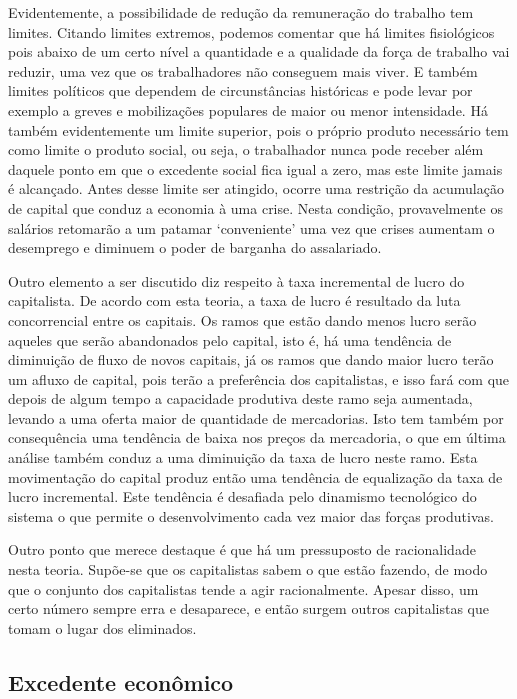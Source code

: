 Evidentemente, a possibilidade de redução da remuneração do trabalho tem limites. Citando limites extremos, podemos comentar que há limites fisiológicos pois abaixo de um certo nível a quantidade e a qualidade da força de trabalho vai reduzir, uma vez que os trabalhadores não conseguem mais viver. E também limites políticos  que dependem de circunstâncias históricas e pode levar por exemplo a greves e mobilizações populares de maior ou menor intensidade. Há também evidentemente um limite superior, pois o próprio produto necessário tem como limite o produto social, ou seja, o trabalhador nunca pode receber além daquele ponto em que o excedente social fica igual a zero, mas este limite jamais é alcançado. Antes desse limite ser atingido, ocorre uma restrição da acumulação de capital que conduz a economia à uma crise. Nesta condição, provavelmente os salários retomarão a um patamar `conveniente' uma vez que crises aumentam o desemprego e diminuem o poder de barganha do assalariado.

Outro elemento a ser discutido diz respeito à taxa incremental de lucro do capitalista. De acordo com esta teoria, a taxa de lucro  é resultado da luta concorrencial entre os capitais. Os ramos que estão dando menos lucro serão aqueles que serão abandonados pelo capital, isto é, há uma tendência de diminuição de fluxo de novos capitais, já os ramos que dando maior lucro terão um afluxo de capital, pois terão a preferência dos capitalistas, e isso fará com que depois de algum tempo a capacidade produtiva deste ramo seja aumentada, levando a uma oferta maior de quantidade de mercadorias. Isto tem também por consequência uma tendência de baixa nos preços da mercadoria, o que em última análise também conduz a uma diminuição da taxa de lucro neste ramo. Esta movimentação do capital produz então uma tendência de equalização da taxa de lucro incremental. Este tendência é desafiada pelo dinamismo  tecnológico do sistema o que permite o desenvolvimento cada vez maior das forças produtivas.

Outro ponto que merece destaque é que há um pressuposto de racionalidade nesta teoria. Supõe-se que os capitalistas sabem o que estão fazendo, de modo que o conjunto dos capitalistas tende a agir racionalmente. Apesar disso, um certo número sempre erra e desaparece, e então surgem outros capitalistas que tomam  o lugar dos eliminados.  

\subsection{Excedente econômico}

